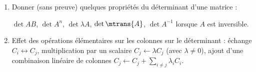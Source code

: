 \documentclass[a4paper,french,bookmarks]{article}
\begin{document}
\begin{enumerate}
{\begin{form}{Méthode}{}
\begin{enumerate}
                    Les $k_i$, rangés dans l'ordre croissent forment d'ailleurs le .
                    
                    \itt La signature de $\sigma$ est le produit des signatures des cycles :
                    \[ \prod_{i=1}^p \epsilon\p{C_i} = \prod_{i=1}^p \p{-1}^{k_i - 1} =
                    \p{-1}^{\p{\sum_{i=1}^p k_i} - p} = \p{-1}^{n-p} \]
                    \bf{\itstar Donc pour $n \in \bdN$ et $\sigma \in \bfS_n$, on a
                    $\epsilon\p{\sigma} = \p{-1}^{n - p}$ où $p$ est le nombre de
                    cycles/d'orbites de $\sigma$.}
                \end{enumerate}
            \end{form}
        }
        \yesbefore
        
        \item Donner (sans preuve) quelques propriétés du déterminant d'une matrice :
        
        $\det{AB}$, $\det{A^n}$, $\det{\lambda A}$, $\det{\mtrans{A}}$, $\det{A^{-1}}$ lorsque
        $A$ est inversible.
        
        
        \item Effet des opérations élémentaires sur les colonnes sur le déterminant : échange $C_i \leftrightarrow C_j$, multiplication par un scalaire $C_j
        \leftarrow \lambda C_j$ (avec $\lambda \neq 0$), ajout d'une combinaison
        linéaire de colonnes $C_j \leftarrow C_j + \sum\limits_{i \neq j} \lambda_i C_i$.
        

\end{enumerate}
\end{document}
